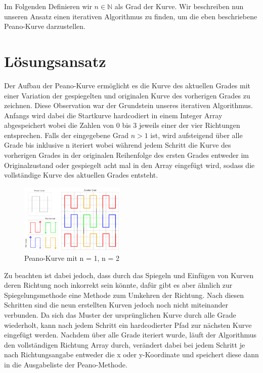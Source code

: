 \documentclass[course=asp]{aspdoc}
\begin{document}
Im Folgenden Definieren wir $n \in \mathbb{N}$ als Grad der Kurve.
Wir beschreiben nun unseren Ansatz einen iterativen Algorithmus zu finden, um die eben beschriebene Peano-Kurve darzustellen. %

\newpage

\section{Lösungsansatz}
Der Aufbau der Peano-Kurve ermöglicht es die Kurve des aktuellen Grades mit einer Variation der gespiegelten und originalen Kurve des vorherigen Grades zu zeichnen.
Diese Observation war der Grundstein unseres iterativen Algorithmus. Anfangs wird dabei die Startkurve hardcodiert in einem Integer Array abgespeichert wobei die Zahlen von 0 bis 3 jeweils einer der vier Richtungen entsprechen. Falls der eingegebene Grad $n>1$ ist, wird aufsteigend über alle Grade bis inklusive n iteriert wobei während jedem Schritt die Kurve des vorherigen Grades in der originalen Reihenfolge des ersten Grades entweder im Originalzustand oder gespiegelt acht mal in den Array eingefügt wird, sodass die vollständige Kurve des aktuellen Grades entsteht. 

\begin{figure} 	%
\centering
\includegraphics[width=50mm,scale=0.5]{PeanoFarbcodiert.png}
\caption{Peano-Kurve mit n = 1, n = 2}\label{Abb:Peano Lösungsidee}
\end{figure}

Zu beachten ist dabei jedoch, dass durch das Spiegeln und Einfügen von Kurven deren Richtung noch inkorrekt sein könnte, dafür gibt es aber ähnlich zur Spiegelungsmethode eine Methode zum Umkehren der Richtung. Nach diesen Schritten sind die neun erstellten Kurven jedoch noch nicht miteinander verbunden. Da sich das Muster der ursprünglichen Kurve durch alle Grade wiederholt, kann nach jedem Schritt ein hardcodierter Pfad zur nächsten Kurve eingefügt werden.
Nachdem über alle Grade iteriert wurde, läuft der Algorithmus den vollständigen Richtung Array durch, verändert dabei bei jedem Schritt je nach Richtungsangabe entweder die x oder y-Koordinate und speichert diese dann in die Ausgabeliste der Peano-Methode.
\end{document}
